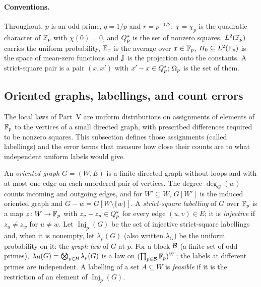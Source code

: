 \paragraph{Conventions.}
Throughout, $p$ is an odd prime, $q=1/p$ and $r=p^{-1/2}$; $\chi=\chi_p$ is the
quadratic character of $\mathbb F_p$ with $\chi(0)=0$, and $Q_{p}^{*}$ is the set of nonzero
squares. $L^2(\mathbb F_p)$ carries the uniform probability, $\mathbb E_x$ is the average over
$x\in\mathbb F_p$, $H_0\subseteq L^2(\mathbb F_p)$ is the space of mean-zero functions and
$\mathbb J$ is the projection onto the constants. A strict-square pair is a pair
$(x,x')$ with $x'-x\in Q_{p}^{*}$; $\Omega_{p}$ is the set of them.

\subsection{Oriented graphs, labellings, and count errors}\label{subsec:labellings:defs}

The local laws of Part~V are uniform distributions on assignments
of elements of $\mathbb F_p$ to the vertices of a small directed graph,
with prescribed differences required to be nonzero squares. This
subsection defines those assignments (called labellings) and the
error terms that measure how close their counts are to what
independent uniform labels would give.

\begin{definition}
\label{def:graphs:labeling}
An \emph{oriented graph} $G=(W,E)$ is a finite directed graph without loops
and with at most one edge on each unordered pair of vertices. The degree
$\deg_G(w)$ counts incoming and outgoing edges, and for $W'\subseteq W$,
$G[W']$ is the induced oriented graph and $G-w=G[W\setminus\{w\}]$. A
\emph{strict-square labelling} of $G$ over $\mathbb F_p$ is a map $z\colon W\to\mathbb F_p$ with
$z_v-z_u\in Q_{p}^{*}$ for every edge $(u,v)\in E$; it is \emph{injective} if
$z_u\ne z_w$ for $u\ne w$. Let $\operatorname{Inj}_p(G)$ be the set of injective
strict-square labellings and, when it is nonempty, let $\lambda_p(G)$ (also
written $\lambda_G$) be the uniform probability on it: the \emph{graph law} of
$G$ at $p$. For a block $\mathcal B$ (a finite set of odd primes),
$\lambda_{\mathcal B}(G)=\bigotimes_{p\in\mathcal B}\lambda_p(G)$ is a law on
$(\prod_{p\in\mathcal B}\mathbb F_p)^W$; the labels at different primes are independent. A
labelling of a set $A\subseteq W$ is \emph{feasible} if it is the restriction
of an element of $\operatorname{Inj}_p(G)$.
\end{definition}

